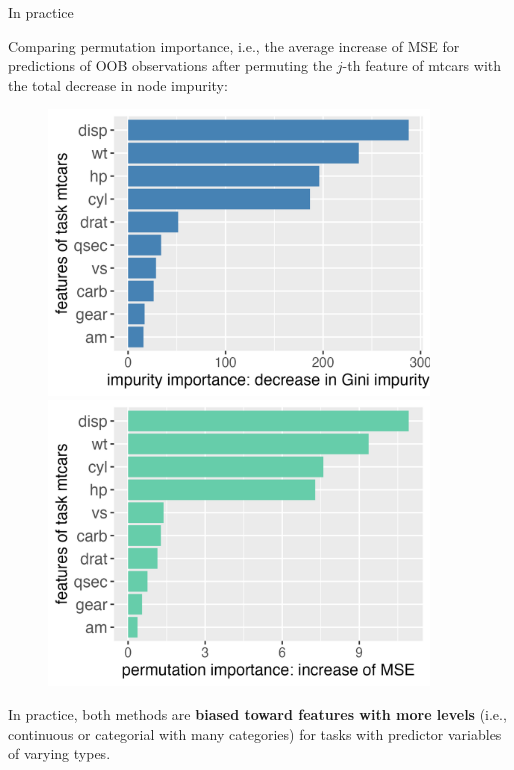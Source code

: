 \documentclass[11pt,compress,t,notes=noshow, xcolor=table]{beamer}
\begin{document}
\begin{vbframe}{In practice}

{\small
Comparing permutation importance, i.e., the average increase of MSE for predictions of OOB observations after permuting the $j$-th feature of mtcars with the total decrease in node impurity:
}
\begin{figure}
\centering
\begin{minipage}{.5\textwidth}
  \centering
  \includegraphics[width=0.9\textwidth]{figure/forest-fimp_gini.png}
\end{minipage}%
\begin{minipage}{.5\textwidth}
  \centering
  \includegraphics[width=0.9\textwidth]{figure/forest-fimp_perm.png}
\end{minipage}
\end{figure}

{\small
In practice, both methods are \textbf{biased toward features with more levels} (i.e., continuous or categorial with many categories) for tasks with predictor variables of varying types. 
}

\end{vbframe}

\endlecture
\end{document}
